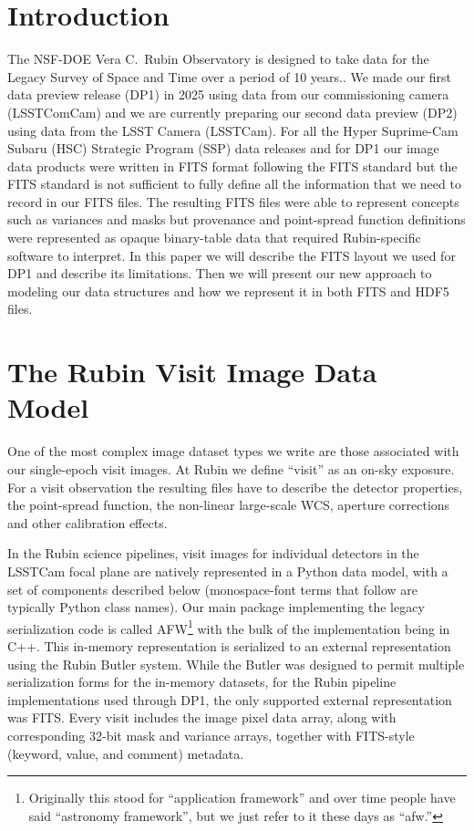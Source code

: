 \section{Introduction}

The NSF-DOE Vera C.\ Rubin Observatory is designed to take data for the Legacy Survey of Space and Time over a period of 10 years.\cite{2019ApJ...873..111I}.
We made our first data preview release (DP1) in 2025 using data from our commissioning camera (LSSTComCam)\cite{2026AJ....171..360V} and we are currently preparing our second data preview (DP2) using data from the LSST Camera (LSSTCam).\cite{10.71929/rubin/2571927,RTN-111}
For all the Hyper Suprime-Cam Subaru (HSC) Strategic Program (SSP) data releases\cite{2022PASJ...74..247A} and for DP1 our image data products were written in FITS format following the FITS standard\cite{FITS4} but the FITS standard is not sufficient to fully define all the information that we need to record in our FITS files.
The resulting FITS files were able to represent concepts such as variances and masks but provenance and point-spread function definitions were represented as opaque binary-table data that required Rubin-specific software\cite{PSTN-019} to interpret.
In this paper we will describe the FITS layout we used for DP1 and describe its limitations.
Then we will present our new approach to modeling our data structures and how we represent it in both FITS and HDF5 files.

\section{The Rubin Visit Image Data Model}

One of the most complex image dataset types we write are those associated with our single-epoch visit images.
At Rubin we define ``visit'' as an on-sky exposure.
For a visit observation the resulting files have to describe the detector properties, the point-spread function, the non-linear large-scale WCS, aperture corrections and other calibration effects.

In the Rubin science pipelines,\cite{PSTN-019} visit images for individual detectors in the LSSTCam focal plane are natively represented in a Python data model, with a set of components described below (monospace-font terms that follow are typically Python class names).
Our main package implementing the legacy serialization code is called AFW\footnote{Originally this stood for ``application framework'' and over time people have said ``astronomy framework'', but we just refer to it these days as ``afw.''} with the bulk of the implementation being in C++.
This in-memory representation is serialized to an external representation using the Rubin Butler system.\cite{2022SPIE12189E..11J}
While the Butler was designed to permit multiple serialization forms for the in-memory datasets, for the Rubin pipeline implementations used through DP1, the only supported external representation was FITS.
Every visit includes the image pixel data array, along with corresponding 32-bit mask and variance arrays, together with FITS-style (keyword, value, and comment) metadata.

